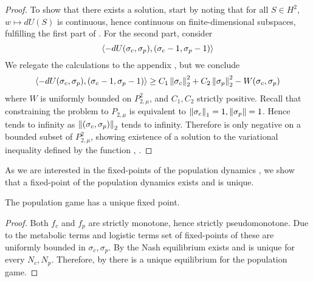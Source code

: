 \begin{proof}
  To show that there exists a solution, start by noting that for all $S\in H^2$, $w\mapsto dU(S)$ is continuous, hence continuous on finite-dimensional subspaces, fulfilling the first part of . For the second part, consider
  \begin{equation}
    \label{eq:du}
    \left \langle -dU(\sigma_c,\sigma_p),(\sigma_c-1, \sigma_p-1) \right \rangle
  \end{equation}
  We relegate the calculations to the appendix , but we conclude
  \begin{equation}
    \label{eq:fin_exist}
    \left \langle -dU(\sigma_c,\sigma_p),(\sigma_c-1, \sigma_p-1) \right \rangle \geq C_1\left \Vert \sigma_c \right \Vert_2^2 + C_2\left \Vert \sigma_p \right \Vert_2^2 - W(\sigma_c,\sigma_p)
  \end{equation}
  where $W$ is uniformly bounded on $P_{2,\mu}^2$, and $C_1,C_2$ strictly positive. Recall that constraining the problem to $P_{2,\mu}$ is equivalent to $\left \Vert \sigma_c \right \Vert_1 = 1, \left \Vert \sigma_p \right \Vert = 1$. Hence  tends to infinity as $\left \Vert (\sigma_c,\sigma_p) \right \Vert_2$ tends to infinity. Therefore  is only negative on a bounded subset of $P^2_{2,\mu}$, showing existence of a solution to the variational inequality defined by the function , .

\end{proof}
As we are interested in the fixed-points of the population dynamics , we show that a fixed-point of the population dynamics exists and is unique.
\begin{corollary}
  The population game  has a unique fixed point.
\end{corollary}
\begin{proof}
Both $f_c$ and $f_p$ are strictly monotone, hence strictly pseudomonotone. Due to the metabolic terms and logistic terms set of fixed-points of these are uniformly bounded in $\sigma_c, \sigma_p$. By  the Nash equilibrium exists and is unique for every $N_c, N_p$. Therefore, by  there is a unique equilibrium for the population game.%
\end{proof}
